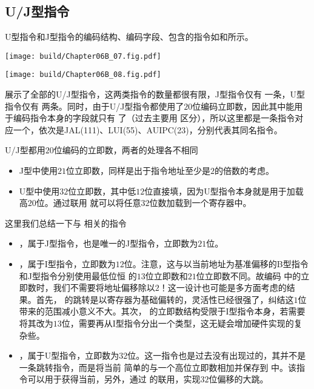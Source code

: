 \subsection{U/J型指令}

U型指令和J型指令的编码结构、编码字段、包含的指令如和所示。
\begin{Figure}[J型指令的编码]
    \texttt{[image: build/Chapter06B\_07.fig.pdf]}
\end{Figure}

\begin{Figure}[U型指令的编码]
    \texttt{[image: build/Chapter06B\_08.fig.pdf]}
\end{Figure}

展示了全部的U/J型指令，这两类指令的数量都很有限，J型指令仅有 一条，U型指令仅有 两条。同时，由于U/J型指令都使用了$20$位编码立即数，因此其中能用于编码指令本身的字段就只有 了（过去主要用 区分），所以这里都是一条指令对应一个，依次是JAL(111)、LUI(55)、AUIPC(23)，分别代表其同名指令。

U/J型都用$20$位编码的立即数，两者的处理各不相同
\begin{itemize}
    \item J型中使用$21$位立即数，同样是出于指令地址至少是$2$的倍数的考虑。
    \item U型中使用$32$位立即数，其中低$12$位直接填，因为U型指令本身就是用于加载高$20$位。通过联用 就可以将任意$32$位数加载到一个寄存器中。
\end{itemize}

这里我们总结一下与 相关的指令
\begin{itemize}
    \item {}，属于J型指令，也是唯一的J型指令，立即数为$21$位。
    \item {}，属于I型指令，立即数为$12$位。注意，这与以当前地址为基准偏移的B型指令和J型指令分别使用最低位恒 的$13$位立即数和$21$位立即数不同。故编码 中的立即数时，我们不需要将地址偏移除以$2$！这一设计也可能是多方面考虑的结果。首先， 的跳转是以寄存器为基础偏转的，灵活性已经很强了，纠结这$1$位带来的范围减小意义不大。其次， 的立即数结构受限于I型指令本身，若需要将其改为$13$位，需要再从I型指令分出一个类型，这无疑会增加硬件实现的复杂些。
    \item {}，属于U型指令，立即数为$32$位。这一指令也是过去没有出现过的，其并不是一条跳转指令，而是将当前 简单的与一个高位立即数相加并保存到 中。该指令可以用于获得当前，另外，通过 的联用，实现$32$位偏移的大跳。
\end{itemize}

